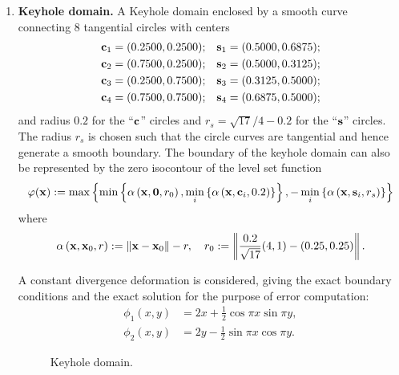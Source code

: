 \begin{enumerate}

\item \textbf{Keyhole domain.} A Keyhole domain enclosed by a smooth curve connecting $8$ tangential circles with centers
\begin{align*}
\mathbf{c}_1 & = (0.2500, 0.2500); & \mathbf{s}_1 & = (0.5000, 0.6875); \\
\mathbf{c}_2 & = (0.7500, 0.2500); & \mathbf{s}_2 & = (0.5000, 0.3125); \\
\mathbf{c}_3 & = (0.2500, 0.7500); & \mathbf{s}_3 & = (0.3125, 0.5000); \\
\mathbf{c}_4 & = (0.7500, 0.7500); & \mathbf{s}_4 & = (0.6875, 0.5000); \\
\end{align*}
and radius $0.2$ for the ``$\mathbf{c}$'' circles and $r_s = \sqrt{17}/4 - 0.2$ for the ``$\mathbf{s}$'' circles. The radius $r_s$ is chosen such that the circle curves are tangential and hence generate a smooth boundary. The boundary of the keyhole domain can also be represented by the zero isocontour of the level set function
\begin{equation*}
\varphi(\mathbf{x}) := \max \left\lbrace  \min \left\lbrace  \alpha \left( \mathbf{x}, \mathbf{0}, r_0 \right), \min_i \left\lbrace  \alpha \left( \mathbf{x}, \mathbf{c}_i, 0.2 \right)  \right\rbrace \right\rbrace, -\min_i \left\lbrace  \alpha \left( \mathbf{x}, \mathbf{s}_i, r_s \right)  \right\rbrace  \right\rbrace
\end{equation*}
where
\begin{equation*}
\alpha \left( \mathbf{x}, \mathbf{x}_0, r \right) := \left\lVert \mathbf{x} - \mathbf{x}_0 \right\rVert - r, \quad
r_0 := \left\lVert \frac{0.2}{\sqrt{17}} (4, 1) - (0.25, 0.25) \right\rVert.
\end{equation*}

A constant divergence deformation is considered, giving the exact boundary conditions and the exact solution for the purpose of error computation:
\begin{align*}
\phi_1(x,y) & = 2x + \frac{1}{2} \cos \pi x \sin \pi y, \\
\phi_2(x,y) & = 2y - \frac{1}{2} \sin \pi x \cos \pi y.
\end{align*}

\setlength{\figureheight}{0.40\columnwidth}
\begin{figure}[htbp]
\begin{center}
\caption{Keyhole domain.}
\end{center}
\end{figure}


\end{enumerate}
